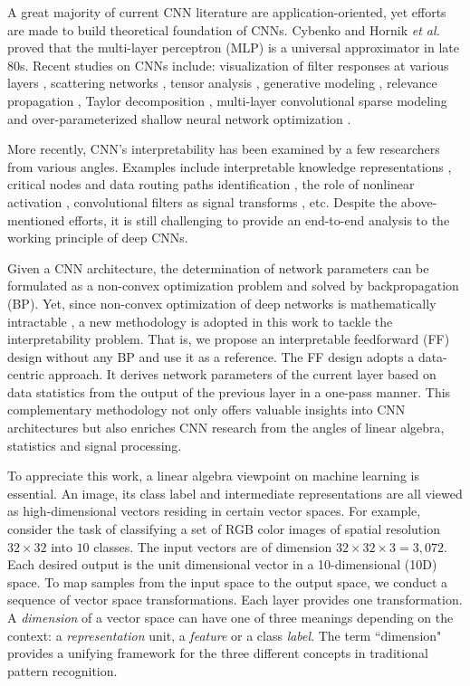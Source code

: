 \documentclass[preprint,12pt]{elsarticle}
\begin{document}
A great majority of current CNN literature are application-oriented,
yet efforts are made to build theoretical foundation of CNNs.  Cybenko
\cite{cybenko1989approximation} and Hornik {\em et al.}
\cite{hornik1989multilayer} proved that the multi-layer perceptron (MLP)
is a universal approximator in late 80s.  Recent studies on CNNs
include: visualization of filter responses at various layers
\cite{simonyan2013deep, zeiler2014visualizing, zhou2014object},
scattering networks \cite{mallat2012group, bruna2013invariant,
wiatowski2015mathematical}, tensor analysis \cite{cohen2015expressive},
generative modeling \cite{dai2014generative}, relevance propagation
\cite{bach2015pixel}, Taylor decomposition
\cite{montavon2015explaining}, multi-layer convolutional sparse modeling
\cite{sulam2017multi} and over-parameterized shallow neural network
optimization \cite{soltanolkotabi2018theoretical}.  

More recently, CNN's interpretability has been examined by a few
researchers from various angles. Examples include interpretable
knowledge representations \cite{zhang2017interpretable}, critical nodes
and data routing paths identification \cite{wang2018interpret}, the role
of nonlinear activation \cite{kuo2016understanding}, convolutional
filters as signal transforms \cite{kuo2017cnn,kuo2018data}, etc.
Despite the above-mentioned efforts, it is still challenging to provide
an end-to-end analysis to the working principle of deep CNNs. 

Given a CNN architecture, the determination of network parameters can be
formulated as a non-convex optimization problem and solved by
backpropagation (BP). Yet, since non-convex optimization of deep
networks is mathematically intractable
\cite{soltanolkotabi2018theoretical}, a new methodology is adopted in
this work to tackle the interpretability problem. That is, we propose an
interpretable feedforward (FF) design without any BP and use it as a
reference. The FF design adopts a data-centric approach.  It derives
network parameters of the current layer based on data statistics from
the output of the previous layer in a one-pass manner.  This
complementary methodology not only offers valuable insights into CNN
architectures but also enriches CNN research from the angles of linear
algebra, statistics and signal processing. 

To appreciate this work, a linear algebra viewpoint on machine learning
is essential. An image, its class label and intermediate representations
are all viewed as high-dimensional vectors residing in certain vector
spaces. For example, consider the task of classifying a set of RGB color
images of spatial resolution $32 \times 32$ into $10$ classes. The input
vectors are of dimension $32 \times 32 \times 3=3,072$. Each desired
output is the unit dimensional vector in a 10-dimensional (10D) space.
To map samples from the input space to the output space, we conduct a
sequence of vector space transformations.  Each layer provides one
transformation.  A {\em dimension} of a vector space can have one of
three meanings depending on the context: a {\em representation} unit, a
{\em feature} or a class {\em label}.  The term ``dimension" provides a
unifying framework for the three different concepts in traditional
pattern recognition.  
\end{document}
